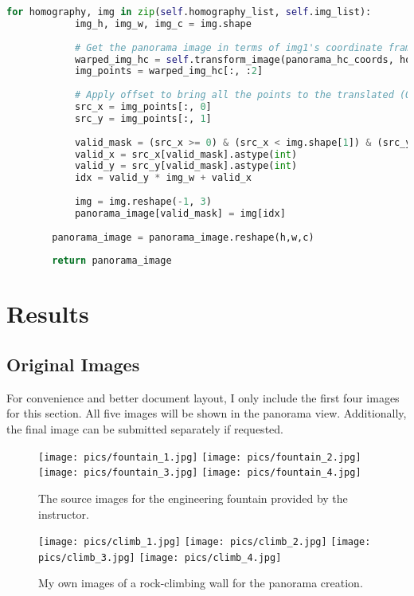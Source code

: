 \documentclass{article}
\begin{document}
\begin{lstlisting}[language=Python]
        for homography, img in zip(self.homography_list, self.img_list):
            img_h, img_w, img_c = img.shape
            
            # Get the panorama image in terms of img1's coordinate frame
            warped_img_hc = self.transform_image(panorama_hc_coords, homography)
            img_points = warped_img_hc[:, :2]
            
            # Apply offset to bring all the points to the translated (0,0) based frame
            src_x = img_points[:, 0]
            src_y = img_points[:, 1]
            
            valid_mask = (src_x >= 0) & (src_x < img.shape[1]) & (src_y >= 0) & (src_y < img.shape[0])
            valid_x = src_x[valid_mask].astype(int)
            valid_y = src_y[valid_mask].astype(int)
            idx = valid_y * img_w + valid_x
            
            img = img.reshape(-1, 3)
            panorama_image[valid_mask] = img[idx]
            
        panorama_image = panorama_image.reshape(h,w,c)
        
        return panorama_image
\end{lstlisting}

\section{Results}
\subsection{Original Images}
For convenience and better document layout, I only include the first four images for this section. All five images will be shown in the panorama view. Additionally, the final image can be submitted separately if requested.
\begin{figure}[H]
    \centering
    \texttt{[image: pics/fountain\_1.jpg]}
    \texttt{[image: pics/fountain\_2.jpg]}
    \texttt{[image: pics/fountain\_3.jpg]}
    \texttt{[image: pics/fountain\_4.jpg]}
    \caption{The source images for the engineering fountain provided by the instructor.}
\end{figure}

\begin{figure}[H]
    \centering
    \texttt{[image: pics/climb\_1.jpg]}
    \texttt{[image: pics/climb\_2.jpg]}
    \texttt{[image: pics/climb\_3.jpg]}
    \texttt{[image: pics/climb\_4.jpg]}
    \caption{My own images of a rock-climbing wall for the panorama creation.}
\end{figure}
\end{document}
